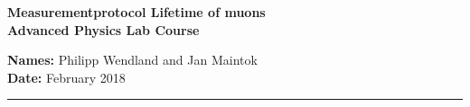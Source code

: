 \begin{centering}
  \vspace*{-10pt}
  \LARGE{\textbf{Measurementprotocol Lifetime of muons\\ Advanced Physics Lab Course}}\\
  \vspace*{20pt}

\normalsize{\textbf{Names:} Philipp Wendland and Jan Maintok} \\
\textbf{Date: } February 2018 \\
 
 \end{centering}

 \vspace*{8pt}

 \rule{\textwidth}{1pt}

 \vspace*{20pt}
